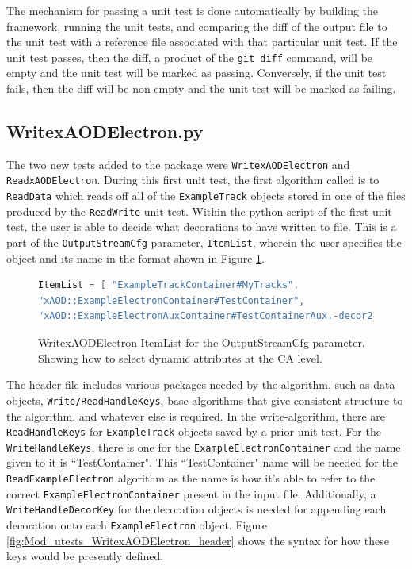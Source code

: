 The mechanism for passing a unit test is done automatically by building the framework, running the unit tests, and comparing the diff of the output file to the unit test with a reference file associated with that particular unit test. 
If the unit test passes, then the diff, a product of the \verb|git diff| command, will be empty and the unit test will be marked as passing.
Conversely, if the unit test fails, then the diff will be non-empty and the unit test will be marked as failing.

\subsection{WritexAODElectron.py}
The two new tests added to the package were \verb|WritexAODElectron| and \verb|ReadxAODElectron|.
During this first unit test, the first algorithm called is to \verb|ReadData| which reads off all of the \verb|ExampleTrack| objects stored in one of the files produced by the \verb|ReadWrite| unit-test.
Within the python script of the first unit test, the user is able to decide what decorations to have written to file. 
This is a part of the \verb|OutputStreamCfg| parameter, \verb|ItemList|, wherein the user specifies the object and its name in the format shown in Figure \ref{fig:Mod_utests_WritexAODElectron_ItemList}. 
\begin{figure}[h]
\centering
\begin{lstlisting}[language=C]
ItemList = [ "ExampleTrackContainer#MyTracks", 
"xAOD::ExampleElectronContainer#TestContainer",
"xAOD::ExampleElectronAuxContainer#TestContainerAux.-decor2"] )
\end{lstlisting}
\caption{WritexAODElectron ItemList for the OutputStreamCfg parameter. Showing how to select dynamic attributes at the CA level.}
\label{fig:Mod_utests_WritexAODElectron_ItemList}
\end{figure}



The header file includes various packages needed by the algorithm, such as data objects, \verb|Write/ReadHandleKeys|, base algorithms that give consistent structure to the algorithm, and whatever else is required. 
In the write-algorithm, there are \verb|ReadHandleKeys| for \verb|ExampleTrack| objects saved by a prior unit test. 
For the \verb|WriteHandleKeys|, there is one for the \verb|ExampleElectronContainer| and the name given to it is ``TestContainer". 
This ``TestContainer" name will be needed for the \verb|ReadExampleElectron| algorithm as the name is how it's able to refer to the correct \verb|ExampleElectronContainer| present in the input file. 
Additionally, a \verb|WriteHandleDecorKey| for the decoration objects is needed for appending each decoration onto each \verb|ExampleElectron| object. 
Figure \ref{fig:Mod_utests_WritexAODElectron_header} shows the syntax for how these keys would be presently defined.


